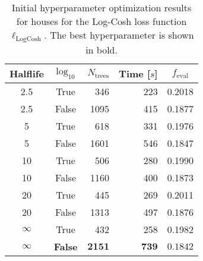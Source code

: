 \begin{table}[h!]
  \centerfloat
  \begin{tabular}{@{}ccrrc@{}}
    Halflife & $\log_{10}$ & $N_\mathrm{trees}$ & Time [$s$] & $f_\mathrm{eval}$ \\
    \midrule
    \num{2.5} & True & \num{346} & \num{223} & \num{0.2018} \\
    \num{2.5} & False & \num{1095} & \num{415} & \num{0.1877} \\
    \num{5} & True & \num{618} & \num{331} & \num{0.1976} \\
    \num{5} & False & \num{1601} & \num{546} & \num{0.1847} \\
    \num{10} & True & \num{506} & \num{280} & \num{0.1990} \\
    \num{10} & False & \num{1160} & \num{400} & \num{0.1873} \\
    \num{20} & True & \num{445} & \num{269} & \num{0.2011} \\
    \num{20} & False & \num{1313} & \num{497} & \num{0.1876} \\
    $\infty$ & True & \num{432} & \num{258} & \num{0.1982} \\
    $\bm{\infty}$ & \textbf{False} & $\mathbf{2151}$ & $\mathbf{739}$ & $\mathbf{0.1842}$ \\
  \end{tabular}
  \caption[Initial Hyperparameter Optimization Results for Houses -- Log-Cosh Loss Function]{\label{tab:h:HPO_initial_Logcosh-villa-appendix}Initial hyperparameter optimization results for houses for the Log-Cosh loss function $\ell_\mathrm{LogCosh}$. The best hyperparameter is shown in bold.}
\end{table}


